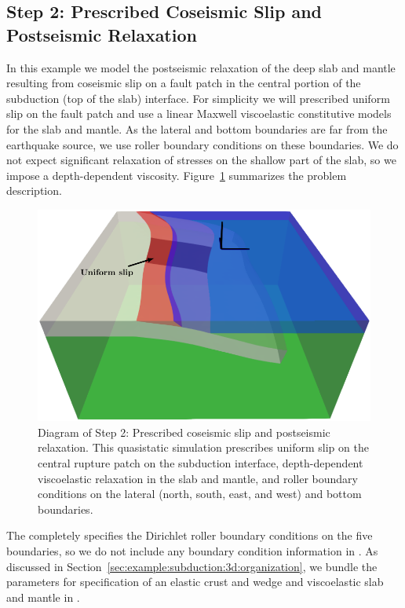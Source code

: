\subsection{Step 2: Prescribed Coseismic Slip and Postseismic Relaxation}
\label{sec:example:subduction:3d:step02}

In this example we model the postseismic relaxation of the deep slab
and mantle resulting from coseismic slip on a fault patch in the
central portion of the subduction (top of the slab) interface. For
simplicity we will prescribed uniform slip on the fault patch and use
a linear Maxwell viscoelastic constitutive models for the slab and
mantle. As the lateral and bottom boundaries are far from the
earthquake source, we use roller boundary conditions on these
boundaries. We do not expect significant relaxation of stresses on the
shallow part of the slab, so we impose a depth-dependent
viscosity. Figure~\ref{fig:example:subduction:3d:step02:diagram}
summarizes the problem description.

\begin{figure}[htbp]
  \includegraphics[scale=0.75]{examples/figs/subduction3d_step02_diagram}
  \caption{Diagram of Step 2: Prescribed coseismic slip and
    postseismic relaxation. This quasistatic simulation prescribes
    uniform slip on the central rupture patch on the subduction interface,
    depth-dependent viscoelastic relaxation in the slab and mantle,
    and roller boundary conditions on the lateral (north, south, east,
    and west) and bottom boundaries.}
  \label{fig:example:subduction:3d:step02:diagram}
\end{figure}

The  completely specifies the Dirichlet roller
boundary conditions on the five boundaries, so we do not include any
boundary condition information in . As discussed
in Section~\vref{sec:example:subduction:3d:organization}, we bundle
the parameters for specification of an elastic crust and wedge and
viscoelastic slab and mantle in .

